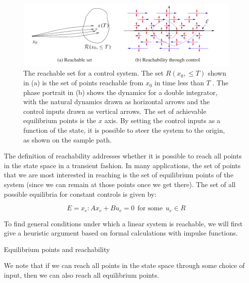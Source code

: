 \begin{figure}[!htb]
\begin{center}
\includegraphics[scale=0.280]{img/state_feedback/reachability.jpeg}
\end{center}
\caption{The reachable set for a control system. The set $R(x_0,\leq T )$ shown in (a) is the set
of points reachable from $x_0$ in time less than $T$ . The phase portrait in (b) shows the dynamics
for a double integrator, with the natural dynamics drawn as horizontal arrows and the control
inputs drawn as vertical arrows. The set of achievable equilibrium points is the $x$ axis. By
setting the control inputs as a function of the state, it is possible to steer the system to the
origin, as shown on the sample path.
}
\label{reachability}
\end{figure}


The definition of reachability addresses whether it is possible to reach all points
in the state space in a transient fashion. In many applications, the set of points that
we are most interested in reaching is the set of equilibrium points of the system
(since we can remain at those points once we get there). The set of all possible
equilibria for constant controls is given by:

\begin{equation}
E = { x_e: Ax_e + Bu_e = 0 ~~ \text{for some} ~~ u_e \in R }
\end{equation}

To find general conditions under which a linear system is reachable, we will
first give a heuristic argument based on formal calculations with impulse functions.

\begin{framed}
\theoremstyle{remark}
\begin{remark}{Equilibrium points and reachability}

We note that if we can reach all points in the state space through some choice of
input, then we can also reach all equilibrium points.
\end{remark}
\end{framed}

